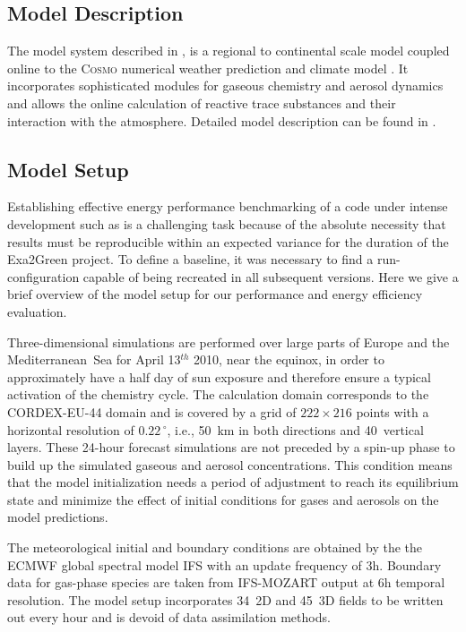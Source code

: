 \subsection{Model Description}
\label{subsec:1.1}

The model  system \cosmoart described  in \cite{Vogel-2009},
is  a  regional to  continental  scale  model  coupled online  to  the
\textsc{Cosmo}   numerical  weather   prediction  and   climate  model
\cite{Baldauf-2011}.   It   incorporates  sophisticated  modules  for
gaseous  chemistry   and  aerosol  dynamics  and   allows  the  online
calculation of  reactive trace  substances and their  interaction with
the  atmosphere.    Detailed  model   description  can  be   found  in
\cite{Bangert-2012, Knote-2011, Knote-2013}.

\subsection{Model Setup}
\label{subsec:1.2}

Establishing effective energy performance benchmarking of a code under
intense development  such as \cosmoart is  a challenging task
because of  the absolute necessity  that results must  be reproducible
within  an  expected  variance  for  the  duration  of  the  Exa2Green
pro\-je\-ct.  To   define  a  baseline,   it  was  necessary  to   find  a
run-configuration  capable  of   being  recreated  in  all  subsequent
versions.  Here  we give a brief  overview of the model  setup for our
performance and energy efficiency evaluation.

Three-dimensional simulations are performed over large parts of Europe
and the Mediterranean~Sea for April 13$^{th}$ 2010, near the equinox, in order to approximately
have a half  day  of  sun  exposure and  therefore  ensure  a typical
activation of the chemistry cycle.  The calculation domain corresponds
to the CORDEX-EU-44 domain and is covered by a grid of $222\times 216$
points with  a horizontal resolution of  $0.22\,^{\circ}$, i.e., 50~km
in  both directions  and 40~vertical  layers.  These  24-hour forecast
simulations  are not  preceded  by  a spin-up  phase  to build up  the
simulated gaseous and  aerosol concentrations.  This condition means 
that the model initialization needs a period of adjustment to reach its equilibrium  state and minimize  the effect of
initial conditions for gases and aerosols on the model predictions.

The meteorological initial and boundary conditions are obtained by the
the ECMWF  global spectral model IFS  with an update  frequency of 3h.
Boundary data  for gas-phase species are taken  from IFS-MOZART output
at  6h temporal resolution.   The model  setup incorporates  34~2D and
45~3D  fields to  be written  out  every hour  and is  devoid of  data
assimilation methods.


